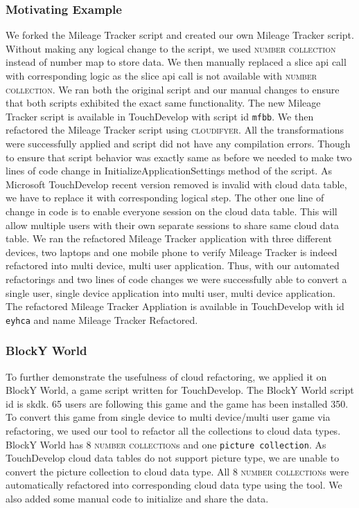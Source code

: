 \documentclass{sigplanconf}
\begin{document}
\subsubsection{Motivating Example}
We forked the Mileage Tracker script and created our own Mileage Tracker script. Without making any logical change to the script, we used \textsc{number collection} instead of number map to store data. We then manually replaced a slice api call with corresponding logic as the slice api call is not available with \textsc{number collection}. We ran both the original script and our manual changes to ensure that both scripts exhibited the exact same functionality. The new Mileage Tracker script is available in TouchDevelop with script id \texttt{mfbb}.  We then refactored the Mileage Tracker script using \textsc{cloudifyer}. All the transformations were successfully applied and script did not have any compilation errors. Though to ensure that script behavior was exactly same as before we needed to make two lines of code change in InitializeApplicationSettings method of the script. As Microsoft TouchDevelop recent version removed is invalid with cloud data table, we have to replace it with corresponding logical step. The other one line of change in code is to enable everyone session on the cloud data table. This will allow multiple users with their own separate sessions to share same cloud data table. We ran the refactored Mileage Tracker application with three different devices, two laptops and one mobile phone to verify Mileage Tracker is indeed refactored into multi device, multi user application. Thus, with our automated refactorings and two lines of code changes we were successfully able to convert a single user, single device application into multi user, multi device application. The refactored Mileage Tracker Appliation is available in TouchDevelop with id \texttt{eyhca} and name Mileage Tracker Refactored. 

\subsubsection{BlockY World}
To further demonstrate the usefulness of cloud refactoring, we applied it on BlockY World, a game script written for TouchDevelop. The BlockY World script id is skdk. 65 users are following this game and the game has been installed 350.  To convert this game from single device to multi device/multi user game via refactoring, we used our tool to refactor all the collections to cloud data types. BlockY World has 8 \textsc{number collection}s and one \texttt{picture collection}. As TouchDevelop cloud data tables do not support picture type, we are unable to convert the picture collection to cloud data type.  All 8 \textsc{number collection}s were automatically refactored into corresponding cloud data type using the tool. We also added some manual code to initialize and share the data. 
\end{document}
